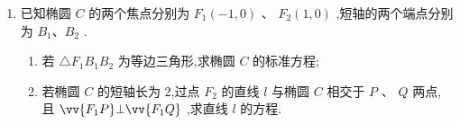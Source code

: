 \begin{enumerate}
    \begin{jieda}
        若 $ \angle P{F}_{2}{F}_{1} $ 为直角,则 $ {\left| P{F}_{1}\right| }^{2} = {\left| P{F}_{2}\right| }^{2} + {\left| {F}_{1}{F}_{2}\right| }^{2} $ ,即 $ {\left| P{F}_{1}\right| }^{2} $
$ = {\left( 6 - \left| P{F}_{1}\right| \right) }^{2} + {20} $ ,
得 $ \left| {P{F}_{1}}\right|  = \dfrac{14}{3},\left| {P{F}_{2}}\right|  = \dfrac{4}{3} $ ,故 $ \dfrac{\left| P{F}_{1}\right| }{\left| P{F}_{2}\right| } = \dfrac{7}{2} $ ;
若 $ \angle {F}_{1}P{F}_{2} $ 为直角,则 $ {\left| {F}_{1}{F}_{2}\right| }^{2} = {\left| P{F}_{1}\right| }^{2} + {\left| P{F}_{2}\right| }^{2} $ ,
即 $ {20} = {\left| P{F}_{1}\right| }^{2} + {\left( 6 - \left| P{F}_{1}\right| \right) }^{2} $ ,
得 $ \left| {P{F}_{1}}\right|  = 4,\left| {P{F}_{2}}\right|  = 2 $ ,故 $ \dfrac{\left| P{F}_{1}\right| }{\left| P{F}_{2}\right| } = 2 $ .
    \end{jieda}

    \item 已知椭圆 $C$ 的两个焦点分别为 ${F}_{1}\left( {-1,0}\right)$ 、 ${F}_{2}\left( {1,0}\right)$ ,短轴的两个端点分别为 ${B}_{1}\text{、}{B}_{2}$ . 
    \begin{enumerate}
        \item 若 $\bigtriangleup {F}_{1}{B}_{1}{B}_{2}$ 为等边三角形,求椭圆 $C$ 的标准方程;
        \item 若椭圆 $C$ 的短轴长为 2,过点 ${F}_{2}$ 的直线 $l$ 与椭圆 $C$ 相交于 $P$ 、 $Q$ 两点,且 $\vv{{F}_{1}P}\bot \vv{{F}_{1}Q}$ ,求直线 $l$ 的方程.
    \end{enumerate}


\end{enumerate}
